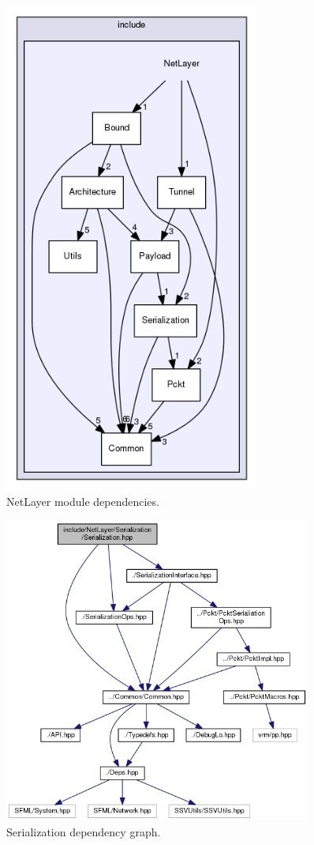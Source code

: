 \documentclass[11pt]{report}
\newcommand{\+}{\discretionary{\mbox{\scriptsize$\hookleftarrow$}}{}{}}
\begin{document}
    \begin{figure}[!htb]
    \caption{NetLayer module dependencies.}
    \centering
    \includegraphics[width=0.75\textwidth]{inc/deps.png}
    \end{figure}

    \begin{figure}[!htb]
    \caption{Serialization dependency graph.}
    \centering
    \includegraphics[width=0.9\textwidth]{inc/dep_ser.png}
    \end{figure}
\end{document}
